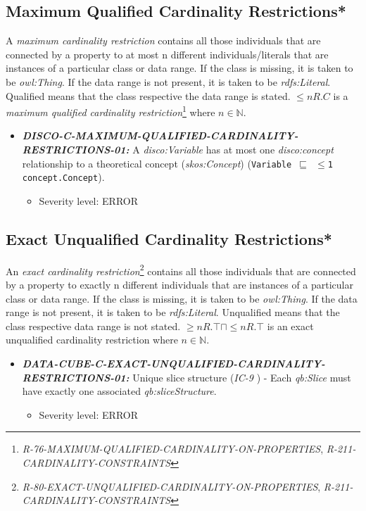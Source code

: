 \documentclass{llncs}
\newcommand{\ms}[1]{\texttt{#1}}
\begin{document}
\subsection{Maximum Qualified Cardinality Restrictions*}

A \emph{maximum cardinality restriction} contains all those individuals that are connected by a property to at most n different individuals/literals that are instances of a particular class or data range. If the class is missing, it is taken to be \emph{owl:Thing}. If the data range is not present, it is taken to be \emph{rdfs:Literal}.
Qualified means that the class respective the data range is stated. 
$\leq n R. C$ is a \emph{maximum qualified cardinality restriction}\footnote{\emph{R-76-MAXIMUM-QUALIFIED-CARDINALITY-ON-PROPERTIES}, \emph{R-211-CARDINALITY-CONSTRAINTS}} where $n \in \mathbb{N}$.

\begin{itemize}
	\item \textbf{{\em DISCO-C-MAXIMUM-QUALIFIED-CARDINALITY-RESTRICTIONS-01:}}
	A {\em disco:Variable} has at most one {\em disco:concept} relationship to a theoretical concept ({\em skos:Concept}) (\ms{Variable $\sqsubseteq$ $\leq$1 concept.Concept}).
	\begin{itemize}
		\item Severity level: ERROR
	\end{itemize}
\end{itemize}

\subsection{Exact Unqualified Cardinality Restrictions*}

An \emph{exact cardinality restriction}\footnote{{\em R-80-EXACT-UNQUALIFIED-CARDINALITY-ON-PROPERTIES}, {\em R-211-CARDINALITY-CONSTRAINTS}} contains all those individuals that are connected by a property to exactly n different individuals that are instances of a particular class or data range. 
If the class is missing, it is taken to be \emph{owl:Thing}. 
If the data range is not present, it is taken to be \emph{rdfs:Literal}.
Unqualified means that the class respective data range is not stated. 
$\geq n R. \top \sqcap \leq n R. \top $ is an exact unqualified cardinality restriction where $n \in \mathbb{N}$.

\begin{itemize}
	\item \textbf{{\em DATA-CUBE-C-EXACT-UNQUALIFIED-CARDINALITY-RESTRICTIONS-01:}}
	Unique slice structure (\emph{IC-9} \cite{CyganiakReynolds2014}) -  
	Each \emph{qb:Slice} must have exactly one associated \emph{qb:sliceStructure}. 
	\begin{itemize}
		\item Severity level: ERROR
	\end{itemize}
\end{itemize}
\end{document}
